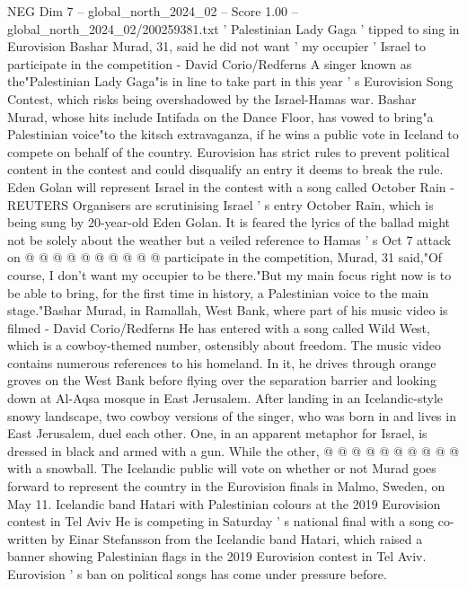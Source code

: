 \begin{textsample}{NEG Dim 7 – global\_north\_2024\_02 – Score 1.00 – global\_north\_2024\_02/200259381.txt}  \label{ex:f7_neg_433}
' Palestinian Lady Gaga ' tipped to sing in Eurovision Bashar Murad, 31, said he did not want ' my occupier ' Israel to participate in the competition - David Corio/Redferns A singer known as the"Palestinian Lady Gaga"is in line to take part in this year ' s Eurovision Song Contest, which risks being overshadowed by the Israel-Hamas war.
Bashar Murad, whose hits include Intifada on the Dance Floor, has vowed to bring"a Palestinian voice"to the kitsch extravaganza, if he wins a public vote in Iceland to compete on behalf of the country.
Eurovision has strict rules to prevent political content in the contest and could disqualify an entry it deems to break the rule.
Eden Golan will represent Israel in the contest with a song called October Rain - REUTERS Organisers are scrutinising Israel ' s entry October Rain, which is being sung by 20-year-old Eden Golan.
It is feared the lyrics of the ballad might not be solely about the weather but a veiled reference to Hamas ' s Oct 7 attack on @ @ @ @ @ @ @ @ @ @ participate in the competition, Murad, 31 said,"Of course, I don't want my occupier to be there."But my main focus right now is to be able to bring, for the first time in history, a Palestinian voice to the main stage."Bashar Murad, in Ramallah, West Bank, where part of his music video is filmed - David Corio/Redferns He has entered with a song called Wild West, which is a cowboy-themed number, ostensibly about freedom.
The music video contains numerous references to his homeland.
In it, he drives through orange groves on the West Bank before flying over the separation barrier and looking down at Al-Aqsa mosque in East Jerusalem.
After landing in an Icelandic-style snowy landscape, two cowboy versions of the singer, who was born in and lives in East Jerusalem, duel each other.
One, in an apparent metaphor for Israel, is dressed in black and armed with a gun.
While the other, @ @ @ @ @ @ @ @ @ @ with a snowball.
The Icelandic public will vote on whether or not Murad goes forward to represent the country in the Eurovision finals in Malmo, Sweden, on May 11.
Icelandic band Hatari with Palestinian colours at the 2019 Eurovision contest in Tel Aviv He is competing in Saturday ' s national final with a song co-written by Einar Stefansson from the Icelandic band Hatari, which raised a banner showing Palestinian flags in the 2019 Eurovision contest in Tel Aviv.
Eurovision ' s ban on political songs has come under pressure before.

\end{textsample}
